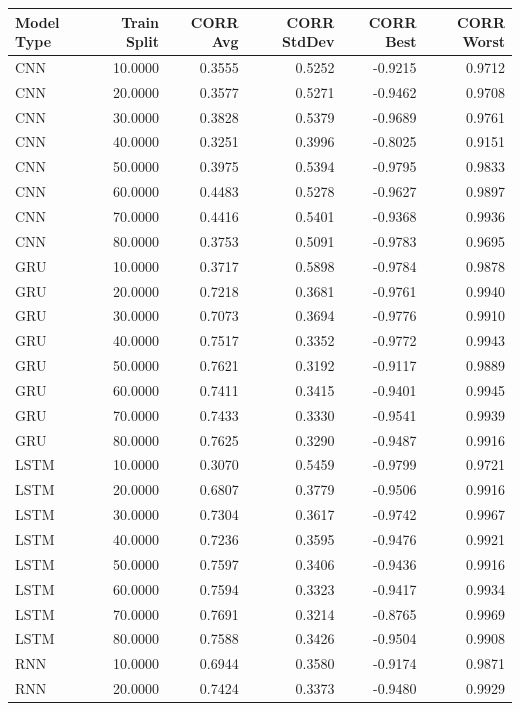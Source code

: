 \begin{tabular}{lrrrrr}
\toprule
Model Type & Train Split & CORR Avg & CORR StdDev & CORR Best & CORR Worst \\
\midrule
CNN & 10.0000 & 0.3555 & 0.5252 & -0.9215 & 0.9712 \\
CNN & 20.0000 & 0.3577 & 0.5271 & -0.9462 & 0.9708 \\
CNN & 30.0000 & 0.3828 & 0.5379 & -0.9689 & 0.9761 \\
CNN & 40.0000 & 0.3251 & 0.3996 & -0.8025 & 0.9151 \\
CNN & 50.0000 & 0.3975 & 0.5394 & -0.9795 & 0.9833 \\
CNN & 60.0000 & 0.4483 & 0.5278 & -0.9627 & 0.9897 \\
CNN & 70.0000 & 0.4416 & 0.5401 & -0.9368 & 0.9936 \\
CNN & 80.0000 & 0.3753 & 0.5091 & -0.9783 & 0.9695 \\
GRU & 10.0000 & 0.3717 & 0.5898 & -0.9784 & 0.9878 \\
GRU & 20.0000 & 0.7218 & 0.3681 & -0.9761 & 0.9940 \\
GRU & 30.0000 & 0.7073 & 0.3694 & -0.9776 & 0.9910 \\
GRU & 40.0000 & 0.7517 & 0.3352 & -0.9772 & 0.9943 \\
GRU & 50.0000 & 0.7621 & 0.3192 & -0.9117 & 0.9889 \\
GRU & 60.0000 & 0.7411 & 0.3415 & -0.9401 & 0.9945 \\
GRU & 70.0000 & 0.7433 & 0.3330 & -0.9541 & 0.9939 \\
GRU & 80.0000 & 0.7625 & 0.3290 & -0.9487 & 0.9916 \\
LSTM & 10.0000 & 0.3070 & 0.5459 & -0.9799 & 0.9721 \\
LSTM & 20.0000 & 0.6807 & 0.3779 & -0.9506 & 0.9916 \\
LSTM & 30.0000 & 0.7304 & 0.3617 & -0.9742 & 0.9967 \\
LSTM & 40.0000 & 0.7236 & 0.3595 & -0.9476 & 0.9921 \\
LSTM & 50.0000 & 0.7597 & 0.3406 & -0.9436 & 0.9916 \\
LSTM & 60.0000 & 0.7594 & 0.3323 & -0.9417 & 0.9934 \\
LSTM & 70.0000 & 0.7691 & 0.3214 & -0.8765 & 0.9969 \\
LSTM & 80.0000 & 0.7588 & 0.3426 & -0.9504 & 0.9908 \\
RNN & 10.0000 & 0.6944 & 0.3580 & -0.9174 & 0.9871 \\
RNN & 20.0000 & 0.7424 & 0.3373 & -0.9480 & 0.9929 \\

\end{tabular}
